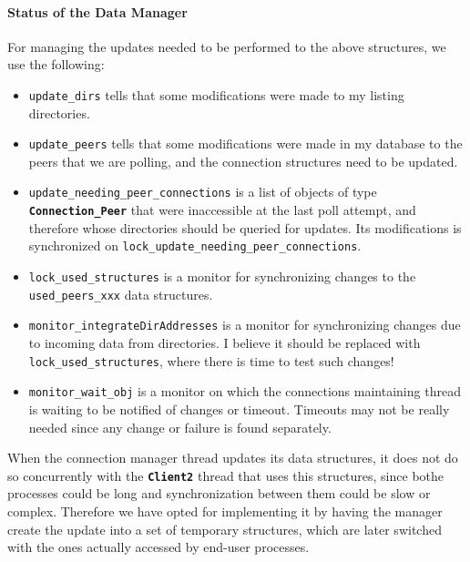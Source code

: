 \documentclass{book}
\newcommand{\cls}[1]{{\tt\bf #1}}
\newcommand{\mmb}[1]{{\tt #1}}
\begin{document}
\paragraph{Status of the Data Manager}
For managing the updates needed to be performed to the above structures, we use the following:
\begin{itemize}
\item
\mmb{update\_dirs} tells that some modifications were made to my listing directories.
\item
\mmb{update\_peers} tells that some modifications were made in my database to the peers that we are polling, and the connection
structures need to be updated.
\item
\mmb{update\_needing\_peer\_connections} is a list of objects of type \cls{Connection\_Peer} that were inaccessible at the last
poll attempt, and therefore whose directories should be queried for updates. Its modifications is synchronized on
\mmb{lock\_update\_needing\_peer\_connections}.
\item
\mmb{lock\_used\_structures} is a monitor for synchronizing changes to the \mmb{used\_peers\_xxx} data structures.
\item
\mmb{monitor\_integrateDirAddresses} is a monitor for synchronizing changes due to incoming data from directories. I believe it
should be replaced with \mmb{lock\_used\_structures}, where there is time to test such changes!
\item
\mmb{monitor\_wait\_obj} is a monitor on which the connections maintaining thread is waiting to be notified of changes or timeout.
Timeouts may not be really needed since any change or failure is found separately.
\end{itemize}


When the connection manager thread updates its data structures, it does not do so concurrently with the \cls{Client2} thread
that uses this structures, since bothe processes could be long and synchronization between them could be slow or complex.
Therefore we have opted for implementing it by having the manager create the update into a set of temporary structures,
which are later switched with the ones actually accessed by end-user processes.
\end{document}
